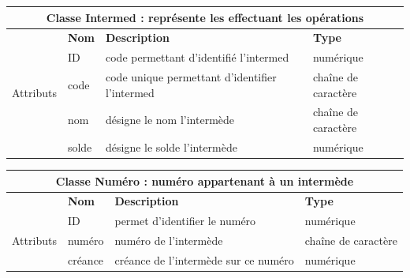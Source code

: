 		\begin{tabular}{|l|l|l|l|}
			\hline
			\multicolumn{4}{|c|}{\textbf{Classe Intermed : représente les effectuant les opérations}} \\
			
			\hline
			
			& \textbf{Nom} & \textbf{Description} & \textbf{Type} \\
			\multirow{3}{*}{Attributs} & ID & code permettant d'identifié l'intermed & numérique \\
			
			& code & code unique permettant d'identifier l'intermed &  chaîne de caractère \\
			
			& nom & désigne le nom l'intermède & chaîne de caractère \\
			
			& solde & désigne le solde l'intermède & numérique \\
			\hline
		\end{tabular}
		\label{table2}
		
		\begin{tabular}{|l|l|l|l|}
			\hline
			\multicolumn{4}{|c|}{\textbf{Classe Numéro : numéro appartenant à un intermède}} \\
			
			\hline
			
			& \textbf{Nom} & \textbf{Description} & \textbf{Type} \\
			\multirow{3}{*}{Attributs} & ID & permet d'identifier le numéro & numérique \\
			
			& numéro & numéro de l'intermède & chaîne de caractère \\
			
			& créance & créance de l'intermède sur ce numéro  & numérique \\
			
			\hline
			
		\end{tabular}
		\label{table3}
		
